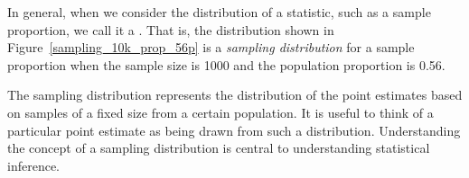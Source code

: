 In general, when we consider the distribution of a statistic, such as
a sample proportion, we call it a .
That is, the distribution shown in Figure~\ref{sampling_10k_prop_56p}
is a \emph{sampling distribution} for a sample proportion when the
sample size is 1000 and the population proportion is 0.56.

\begin{termBox}{
  The sampling distribution represents the distribution of the point
  estimates based on samples of a fixed size from a certain population.
  It is useful to think of a particular point estimate as being drawn
  from such a distribution. Understanding the concept of a sampling
  distribution is central to understanding statistical inference.}
\end{termBox}

